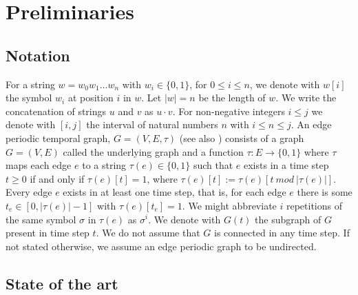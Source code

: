 \chapter{Preliminaries}
\label{ch:Preliminaries}

\section{Notation}
For a string $w = w_0w_1 \dots w_n$ with $w_i \in \{0, 1\}$, for $0 \leq i \leq n$, we denote with $w[i]$ the symbol $w_i$ at position $i$ in $w$. Let $|w| = n$ be the length of $w$. We write the concatenation of strings $u$ and $v$ as $u \cdot v$. For non-negative integers $i \leq j$ we denote with $[i, j]$ the interval of natural numbers $n$ with $i \leq n \leq j$. 
An edge periodic temporal graph, $G = (V, E, \tau)$ (see also \cite{erlebach2020game}) consists of a graph $G = (V, E)$ called the underlying graph and a function $\tau : E \rightarrow \{0, 1\}$ where $\tau$ maps each edge $e$ to a string $\tau(e) \in \{0, 1\}$
such that $e$ exists in a time step $t \geq 0$ if and only if $\tau(e)[t] = 1$, where $\tau(e)[t] := \tau(e)[t~ mod~ |\tau(e)|]$.
Every edge $e$ exists in at least one time step, that is, for each edge $e$ there is some $t_e \in [0, |\tau(e)| - 1]$ with $\tau(e)[t_e] = 1$. We might abbreviate $i$ repetitions of the same symbol $\sigma$ in $\tau(e)$ as $\sigma^i$.
We denote with $G(t)$ the subgraph of $G$ present in time step $t$. We do not assume that $G$ is connected in any time step. If not stated otherwise, we assume an edge periodic graph to be undirected.


\section{State of the art}
